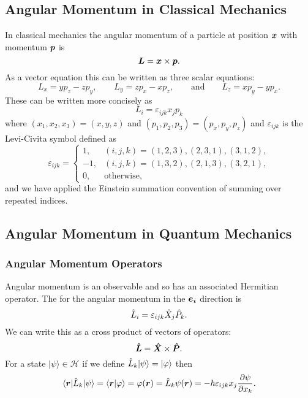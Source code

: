 \documentclass[a4paper]{article}
\renewcommand{\ket}[1]{\vert {#1} \rangle}
\renewcommand{\bra}[1]{\langle {#1} \vert}
\renewcommand{\braket}[2]{\langle {#1} \vert {#2} \rangle}
\newcommand{\hilbert}{\mathcal{H}}
\newcommand{\vecoperator}[1]{\vv{\operator{#1}}}
\theoremstyle{definition}
\begin{document}
    \subsection{Angular Momentum in Classical Mechanics}
    In classical mechanics the angular momentum of a particle at position \(\bm{x}\) with momentum \(\bm{p}\) is
    \[\bm{L} = \bm{x} \times \bm{p}.\]
    As a vector equation this can be written as three scalar equations:
    \[L_x = yp_z - zp_y, \qquad L_y = zp_x - xp_z,\qquad\text{and}\qquad L_z = xp_y - yp_x.\]
    These can be written more concisely as
    \[L_i = \varepsilon_{ijk}x_jp_k\]
    where \((x_1, x_2, x_3) = (x, y, z)\) and \((p_1, p_2, p_3) = (p_x, p_y, p_z)\) and \(\varepsilon_{ijk}\) is the Levi-Civita symbol defined as
    \[
        \varepsilon_{ijk} = 
        \begin{cases}
            1, & (i,j,k) = (1, 2, 3), (2, 3, 1), (3, 1, 2),\\
            -1, & (i, j, k) = (1, 3, 2), (2, 1, 3), (3, 2, 1),\\
            0, & \text{otherwise},
        \end{cases}
    \]
    and we have applied the Einstein summation convention of summing over repeated indices.
    
    \subsection{Angular Momentum in Quantum Mechanics}
    \subsubsection{Angular Momentum Operators}
    Angular momentum is an observable and so has an associated Hermitian operator.
    The  for the angular momentum in the \(\bm{e_{i}}\) direction is
    \[\hat{L}_i = \varepsilon_{ijk}\hat{X}_j\hat{P}_k.\]
    We can write this as a cross product of vectors of operators:
    \[\vecoperator{L} = \vecoperator{X}\times\vecoperator{P}.\]
    For a state \(\ket{\psi}\in\hilbert\) if we define \(\operator{L}_k\ket{\psi} = \ket{\varphi}\) then
    \[\bra{\vv{r}}\operator{L}_k\ket{\psi} = \braket{\vv{r}}{\varphi} = \varphi(\vv{r}) = \operator{L}_k\psi(\vv{r}) = -\hbar\varepsilon_{ijk}x_j\pdv{\psi}{x_k}.\]
    
\end{document}
